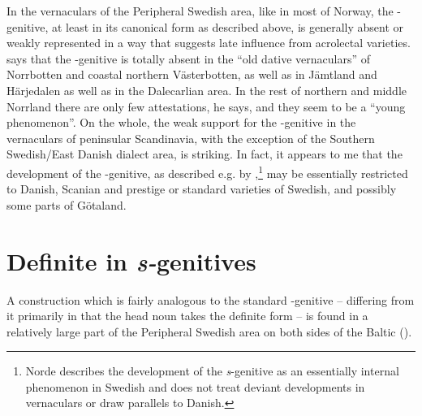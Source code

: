 
In the vernaculars of the Peripheral Swedish area, like in most of Norway, the -genitive, at least in its canonical form as described above, is generally absent or weakly represented in a way that suggests late influence from acrolectal varieties. \citet[41]{Delsing2003a} says that the -genitive is totally absent in the “old dative vernaculars” of Norrbotten and coastal northern Västerbotten, as well as in Jämtland and Härjedalen as well as in the Dalecarlian area. In the rest of northern and middle Norrland there are only few attestations, he says, and they seem to be a “young phenomenon”. On the whole, the weak support for the -genitive in the vernaculars of peninsular Scandinavia, with the exception of the Southern Swedish/East Danish dialect area, is striking. In fact, it appears to me that the development of the -genitive, as described e.g. by \citet{Norde1997},\footnote{ Norde describes the development of the \textit{s}{}-genitive as an essentially internal phenomenon in Swedish and does not treat deviant developments in vernaculars or draw parallels to Danish.} may be essentially restricted to Danish, Scanian and prestige or standard varieties of Swedish, and possibly some parts of Götaland. 


\section{Definite in \textit{s-}genitives}
\label{bkm:Ref137614892}
A construction which is fairly analogous to the standard -genitive – differing from it primarily in that the head noun takes the definite form – is found in a relatively large part of the Peripheral Swedish area on both sides of the Baltic (\citet[27]{Delsing2003a}).


